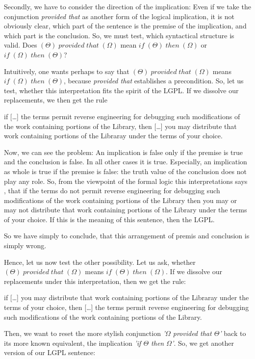 Secondly, we have to consider the direction of the implication: Even if we take
the conjunction \emph{provided that} as another form of the logical implication,
it is not obviously clear, which part of the sentence is the premise of the
implication, and which part is the conclusion. So, we must test, which
syntactical structure is valid. Does $(\Theta) \; provided \; that \; (\Omega)$
mean $if \; (\Theta) \; then \; (\Omega)$ or $if \; (\Omega) \; then \;
(\Theta)$?

Intuitively, one wants perhaps to say that $(\Theta) \; provided \; that \;
(\Omega)$ means $if \; (\Omega) \; then \; (\Theta)$, because \emph{provided
that} establishes a precondition. So, let us test, whether this interpretation
fits the spirit of the LGPL. If we dissolve our replacements, we then get the
rule

if [\ldots] the terms permit reverse engineering for debugging such
modifications of the work containing portions of the Library, then [\ldots] you
may distribute that work containing portions of the Libraray under the terms of your
choice.

Now, we can see the problem: An implication is false only if the premise is true
and the conclusion is false. In all other cases it is true.  Especially, an
implication as whole is true if the premise is false: the truth value of the
conclusion does not play any role. So, from the viewpoint of the formal logic
this interpretations says , that if the terms do not permit reverse
engineering for debugging such modifications of the work containing portions of
the Library then you may or may not distribute that work containing portions of
the Library under the terms of your choice. If this is the meaning of this
sentence, then the LGPL.

So we have simply to conclude, that this arrangement of premis and conclusion is
simply wrong.

Hence, let us now test the other possibility. Let us ask, whether $(\Theta) \;
provided \; that \; (\Omega)$ means $if \; (\Theta) \; then \;  (\Omega)$. If we
dissolve our replacements under this interpretation, then we get the rule:

if [\ldots] you may distribute that work containing portions of the Libraray
under the terms of your choice, then [\ldots] the terms permit reverse
engineering for debugging such modifications of the work containing portions of
the Library.


Then, we want to reset the more stylish conjunction \emph{'$\Omega$ provided
that $\Theta$'} back to its more known equivalent, the implication \emph{'if
$\Theta$ then $\Omega$'}. So, we get another version of our LGPL sentence:

